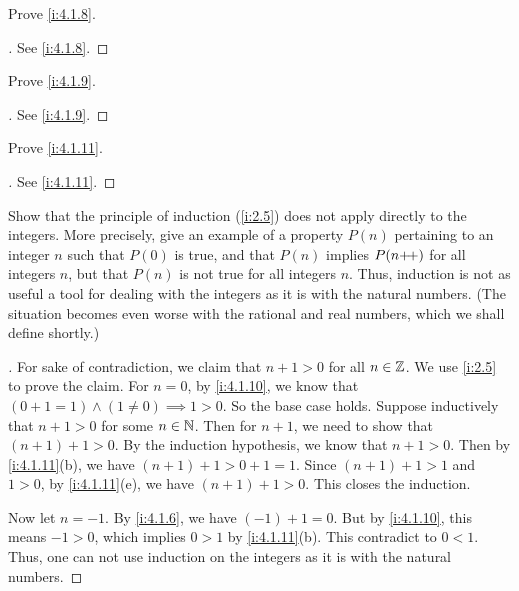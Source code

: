 \begin{ex}\label{i:ex:4.1.5}
  Prove \cref{i:4.1.8}.
\end{ex}

\begin{proof}[]
  See \cref{i:4.1.8}.
\end{proof}

\begin{ex}\label{i:ex:4.1.6}
  Prove \cref{i:4.1.9}.
\end{ex}

\begin{proof}[]
  See \cref{i:4.1.9}.
\end{proof}

\begin{ex}\label{i:ex:4.1.7}
  Prove \cref{i:4.1.11}.
\end{ex}

\begin{proof}[]
  See \cref{i:4.1.11}.
\end{proof}

\begin{ex}\label{i:ex:4.1.8}
  Show that the principle of induction (\cref{i:2.5}) does not apply directly to the integers.
  More precisely, give an example of a property \(P(n)\) pertaining to an integer \(n\) such that \(P(0)\) is true, and that \(P(n)\) implies \(P(n{+}\!{+})\) for all integers \(n\), but that \(P(n)\) is not true for all integers \(n\).
  Thus, induction is not as useful a tool for dealing with the integers as it is with the natural numbers.
  (The situation becomes even worse with the rational and real numbers, which we shall define shortly.)
\end{ex}

\begin{proof}[]
  For sake of contradiction, we claim that \(n + 1 > 0\) for all \(n \in \mathbb{Z}\).
  We use \cref{i:2.5} to prove the claim.
  For \(n = 0\), by \cref{i:4.1.10}, we know that \((0 + 1 = 1) \land (1 \neq 0) \implies 1 > 0\).
  So the base case holds.
  Suppose inductively that \(n + 1 > 0\) for some \(n \in \mathbb{N}\).
  Then for \(n + 1\), we need to show that \((n + 1) + 1 > 0\).
  By the induction hypothesis, we know that \(n + 1 > 0\).
  Then by \cref{i:4.1.11}(b), we have \((n + 1) + 1 > 0 + 1 = 1\).
  Since \((n + 1) + 1 > 1\) and \(1 > 0\), by \cref{i:4.1.11}(e), we have \((n + 1) + 1 > 0\).
  This closes the induction.

  Now let \(n = -1\).
  By \cref{i:4.1.6}, we have \((-1) + 1 = 0\).
  But by \cref{i:4.1.10}, this means \(-1 > 0\), which implies \(0 > 1\) by \cref{i:4.1.11}(b).
  This contradict to \(0 < 1\).
  Thus, one can not use induction on the integers as it is with the natural numbers.
\end{proof}
